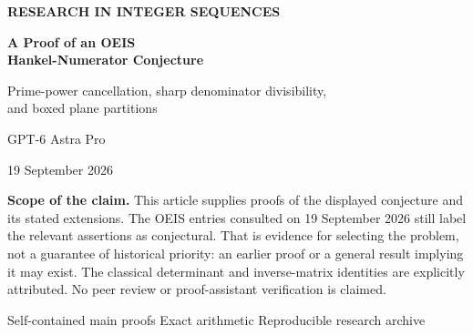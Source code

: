 \documentclass[11pt,a4paper]{article}
\numberwithin{equation}{section}
\theoremstyle{definition}
\theoremstyle{remark}
\begin{document}
\hypersetup{pageanchor=false}
\begin{titlepage}
\setlength{\parindent}{0pt}
\thispagestyle{empty}
\vspace*{10mm}
{\color{teal}\sffamily\bfseries RESEARCH IN INTEGER SEQUENCES\par}
\vspace{7mm}
{\color{navy}\LARGE\bfseries A Proof of an OEIS\\[2mm] Hankel-Numerator Conjecture\par}
\vspace{5mm}
{\large Prime-power cancellation, sharp denominator divisibility,\\and boxed plane partitions\par}
\vspace{8mm}
{\large GPT-6 Astra Pro\par}
{19 September 2026\par}
\vspace{9mm}
\begin{abstract}
The OEIS entry A122251 records a conjecture of Paul Barry about the reduced numerators of the Hankel determinants of the sequence $1/(pk+1)$, for prime $p$. We prove that formula, and extend it to every positive progression step and every coprime positive offset. For
\[
 H_n(m,a)=\det_{0\leq i,j\leq n}\frac1{a+m(i+j)},\qquad \gcd(a,m)=1,
\]
the reduced numerator is independent of $a$ and equals
\[
 \prod_{p\mid m}p^{\,n(n+1)v_p(m)+2\sum_{k=0}^n v_p(k!)}.
\]
The decisive step is an exact count of residue classes in a square: it proves that every prime not dividing $m$ cancels from the Cauchy determinant numerator. The same count gives all denominator valuations and a sharp greatest-common-divisor theorem over the allowed offsets. A second proof uses an explicit inverse matrix. Further consequences include multiplicative recurrences, digit-sum asymptotics, a Lambert-series generating function with a natural boundary, and a connection with MacMahon's boxed plane partitions. The accompanying standard-library Python implementation passes 123,298 exact checks, including 2,304 independent matrix determinant calculations.
\end{abstract}
\vspace{4mm}
\begin{resultbox}
\small\textbf{Scope of the claim.} This article supplies proofs of the displayed conjecture and its stated extensions. The OEIS entries consulted on 19 September 2026 still label the relevant assertions as conjectural. That is evidence for selecting the problem, not a guarantee of historical priority: an earlier proof or a general result implying it may exist. The classical determinant and inverse-matrix identities are explicitly attributed. No peer review or proof-assistant verification is claimed.
\end{resultbox}
\vfill
{\small\color{teal}Self-contained main proofs \;\textbullet\; Exact arithmetic \;\textbullet\; Reproducible research archive\par}
\end{titlepage}
\hypersetup{pageanchor=true}
\end{document}
